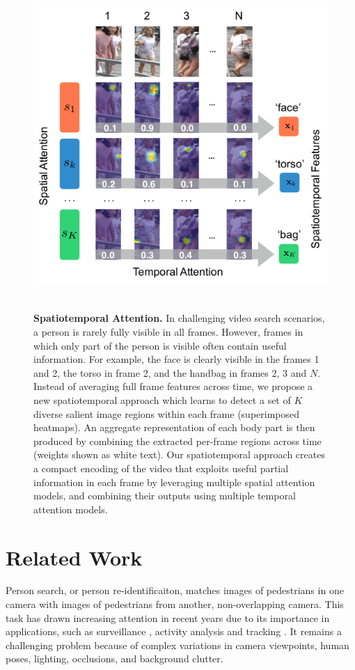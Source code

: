 \begin{figure}[t]
\begin{center}
\includegraphics[width=0.8\linewidth]{figures/person_reid/ls1.pdf} \ \\
\end{center}
\caption{
\textbf{Spatiotemporal Attention.} In challenging video search scenarios, a person is rarely fully visible in all frames.  However, frames in which only part of the person is visible often contain useful information.  For example, the face is clearly visible in the frames 1 and 2, the torso in frame 2, and the handbag in frames 2, 3 and $N$.  Instead of averaging full frame features across time, we propose a new spatiotemporal approach which learns to detect a set of $K$ diverse salient image regions within each frame (superimposed heatmaps).  An aggregate representation of each body part is then produced by combining the extracted per-frame regions across time (weights shown as white text). Our spatiotemporal approach creates a compact encoding of the video that exploits useful partial information in each frame by leveraging multiple spatial attention models, and combining their outputs using multiple temporal attention models.}
\label{intro}
\end{figure}



\section{Related Work} %
Person search, or person re-identificaiton, matches images of pedestrians in one camera with images of pedestrians from another, non-overlapping camera. This task has drawn increasing attention in recent years due to its importance in applications, such as  surveillance \cite{wang2013intelligent}, activity analysis \cite{loy2009multi} and tracking \cite{yu2013harry}. It remains a challenging problem because of complex variations in camera viewpoints, human poses, lighting, occlusions, and background clutter.

